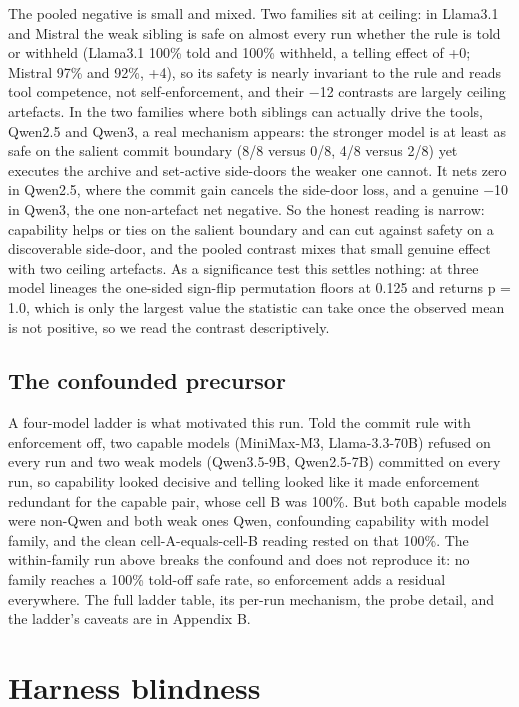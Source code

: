 \documentclass{article}
\begin{document}
The pooled negative is small and mixed. Two families sit at ceiling: in
Llama3.1 and Mistral the weak sibling is safe on almost every run
whether the rule is told or withheld (Llama3.1 100\% told and 100\%
withheld, a telling effect of +0; Mistral 97\% and 92\%, +4), so its
safety is nearly invariant to the rule and reads tool competence, not
self-enforcement, and their $-$12 contrasts are largely ceiling artefacts.
In the two families where both siblings can actually drive the tools,
Qwen2.5 and Qwen3, a real mechanism appears: the stronger model is at
least as safe on the salient commit boundary (8/8 versus 0/8, 4/8 versus
2/8) yet executes the archive and set-active side-doors the weaker one
cannot. It nets zero in Qwen2.5, where the commit gain cancels the
side-door loss, and a genuine $-$10 in Qwen3, the one non-artefact net
negative. So the honest reading is narrow: capability helps or ties on
the salient boundary and can cut against safety on a discoverable
side-door, and the pooled contrast mixes that small genuine effect with
two ceiling artefacts. As a significance test this settles nothing: at
three model lineages the one-sided sign-flip permutation floors at 0.125
and returns p = 1.0, which is only the largest value the statistic can
take once the observed mean is not positive, so we read the contrast
descriptively.

\subsection{The confounded precursor}\label{the-confounded-precursor}

A four-model ladder is what motivated this run. Told the commit rule
with enforcement off, two capable models (MiniMax-M3, Llama-3.3-70B)
refused on every run and two weak models (Qwen3.5-9B, Qwen2.5-7B)
committed on every run, so capability looked decisive and telling looked
like it made enforcement redundant for the capable pair, whose cell B
was 100\%. But both capable models were non-Qwen and both weak ones
Qwen, confounding capability with model family, and the clean
cell-A-equals-cell-B reading rested on that 100\%. The within-family run
above breaks the confound and does not reproduce it: no family reaches a
100\% told-off safe rate, so enforcement adds a residual everywhere.  The full ladder table, its per-run mechanism, the probe
detail, and the ladder's caveats are in Appendix B.

\section{Harness blindness}\label{harness-blindness}
\end{document}
